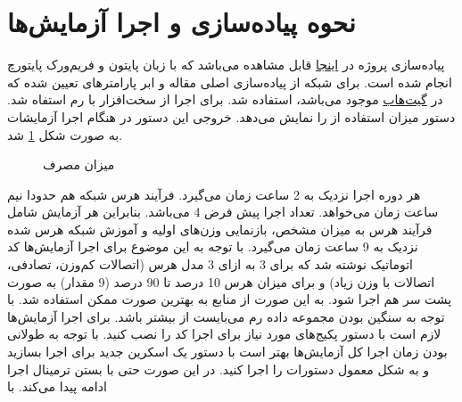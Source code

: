 \newpage
\section{نحوه پیاده‌سازی و اجرا آزمایش‌ها}
پیاده‌سازی پروژه در 
\href{https://github.com/ghazaleh-mahmoodi/LXMERT-Compression}{اینجا}
قابل مشاهده می‌باشد که با زبان پایتون و فریم‌ورک پایتورچ انجام شده است. برای شبکه 
از پیاده‌سازی اصلی مقاله و ابر پارامتر‌های تعیین شده که در 
\href{https://github.com/airsplay/lxmert}{گیت‌هاب}
موجود می‌باشد، استفاده شد.
\newline
برای اجرا از سخت‌افزار
با رم 
استفاه شد. دستور 
میزان استفاده از 
را نمایش می‌دهد. خروجی این دستور در هنگام اجرا آزمایشات به صورت شکل \ref{nvidia-smi} شد.
\begin{figure}[H]		  		    
	\caption{میزان مصرف
}
	\label{nvidia-smi}
\end{figure}
هر دوره
اجرا نزدیک به 2 ساعت زمان می‌گیرد. فرآیند هرس شبکه هم حدودا نیم ساعت زمان می‌خواهد. تعداد اجرا پیش فرض 4 می‌باشد. بنابراین هر آزمایش شامل فرآیند هرس به میزان مشخص، بازنمایی
 وزن‌های اولیه و آموزش شبکه هرس شده نزدیک به 9 ساعت زمان می‌گیرد. با توجه به این موضوع برای اجرا آزمایش‌ها کد اتوماتیک نوشته شد که برای 3 
به ازای 3 مدل هرس (اتصالات کم‌وزن، تصادفی، اتصالات با وزن زیاد) و برای میزان هرس 10 درصد تا 90 درصد (9 مقدار) به صورت پشت سر هم اجرا شود. به این صورت از منابع 
به بهترین صورت ممکن استفاده شد.
با توجه به سنگین بودن مجموعه داده 
رم
می‌بایست از 
بیشتر باشد. 
\newline
\newline
برای اجرا آزمایش‌ها لازم است با دستور 
پکیج‌های مورد نیاز برای اجرا کد را نصب کنید. با توجه به طولانی بودن زمان اجرا کل آزمایش‌ها بهتر است با دستور 
یک اسکرین جدید برای اجرا بسازید و به شکل معمول دستورات را اجرا کنید. در این صورت حتی با بستن ترمینال اجرا ادامه پیدا می‌کند. با
